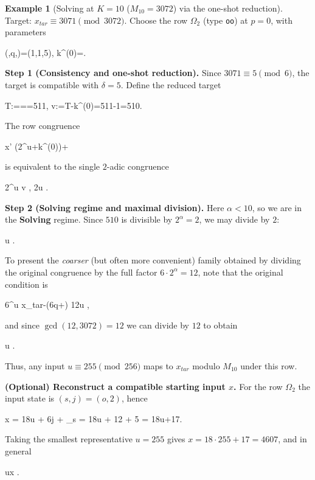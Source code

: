 \documentclass[11pt,letterpaper]{amsart}
\def\mathrm#1{#1}%
\def\[{ }%
\def\]{ }%
\theoremstyle{definition}
\newtheorem{example}{Example}
\theoremstyle{plain}
\theoremstyle{plain}
\theoremstyle{remark}
\begin{document}
\begin{example}[Solving at $K=10$ ($M_{10}=3072$) via the one-shot reduction]
Target: $x_{\mathrm{tar}} \equiv 3071 \pmod{3072}$.
Choose the row $\Omega_2$ (type \texttt{oo}) at $p=0$, with parameters
\[
(\alpha,q,\delta)=(1,1,5),
\qquad k^{(0)}=.
\]

\smallskip
\noindent\textbf{Step 1 (Consistency and one-shot reduction).}
Since $3071\equiv 5\pmod 6$, the target is compatible with $\delta=5$.
Define the reduced target
\[
T:=\frac{x_{\mathrm{tar}}-\delta}{6}==511,
\qquad
v:=T-k^{(0)}=511-1=510.
\]
The row congruence
\[
x' (2^\alpha u+k^{(0)})+\delta {}
\]
is equivalent to the single $2$-adic congruence
\[
2^\alpha u \equiv v ,
\qquad{}\qquad
2u  .
\]

\smallskip
\noindent\textbf{Step 2 (Solving regime and maximal division).}
Here $\alpha<10$, so we are in the \textbf{Solving} regime.  Since $510$ is divisible by $2^\alpha=2$, we may divide by $2$:
\[
u  .
\]
To present the \emph{coarser} (but often more convenient) family obtained by dividing the original congruence by the full factor
$6\cdot 2^\alpha=12$, note that the original condition is
\[
6^\alpha u \equiv x_{\mathrm{tar}}-(6q+\delta) 
\quad\Longleftrightarrow\quad
12u  ,
\]
and since $\gcd(12,3072)=12$ we can divide by $12$ to obtain
\[
u  .
\]
Thus, any input $u\equiv 255\pmod{256}$ maps to $x_{\mathrm{tar}}$ modulo $M_{10}$ under this row.

\smallskip
\noindent\textbf{(Optional) Reconstruct a compatible starting input $x$.}
For the row $\Omega_2$ the input state is $(s,j)=(o,2)$, hence
\[
x = 18u + 6j + \delta_s = 18u + 12 + 5 = 18u+17.
\]
Taking the smallest representative $u=255$ gives $x=18\cdot 255+17=4607$, and in general
\[
u\quad\Longrightarrow\quad x .
\]
\end{example}
\end{document}
